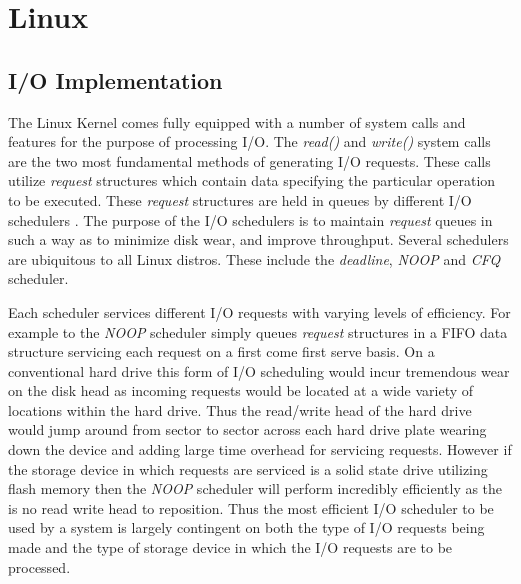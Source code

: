 \section{\bf Linux}
  \subsection{\bf I/O Implementation}
    \normalfont \indent The Linux Kernel comes fully equipped with a number of system calls and features for the purpose of processing I/O. The \textit{read()} and \textit{write()} system calls are the two most fundamental methods of generating I/O requests. These calls utilize \textit{request} structures which contain data specifying the particular operation to be executed. These \textit{request} structures are held in queues by different I/O schedulers \cite{LinuxPage}. The purpose of the I/O schedulers is to maintain \textit{request} queues in such a way as to minimize disk wear, and improve throughput. Several schedulers are ubiquitous to all Linux distros. These include the \textit{deadline}, \textit{NOOP} and \textit{CFQ} scheduler. 

	\normalfont \indent Each scheduler services different I/O requests with varying levels of efficiency. For example to the \textit{NOOP} scheduler simply queues \textit{request} structures in a FIFO data structure servicing each request on a first come first serve basis. On a conventional hard drive this form of I/O scheduling would incur tremendous wear on the disk head as incoming requests would be located at a wide variety of locations within the hard drive. Thus the read/write head of the hard drive would jump around from sector to sector across each hard drive plate wearing down the device and adding large time overhead for servicing requests. However if the storage device in which requests are serviced is a solid state drive utilizing flash memory then the \textit{NOOP} scheduler will perform incredibly efficiently as the is no read write head to reposition. Thus the most efficient I/O scheduler to be used by a system is largely contingent on both the type of I/O requests being made and the type of storage device in which the I/O requests are to be processed. \\

